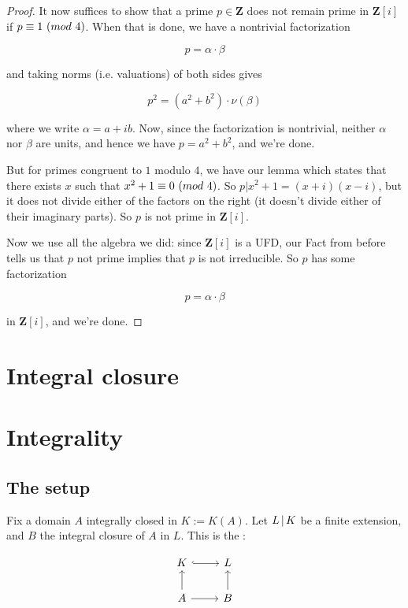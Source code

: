 \begin{proof}
  It now suffices to show that a prime \(p\in{\mathbf Z}\) does not remain prime
  in \({\mathbf Z}[i]\) if \(p\equiv 1\ (\mathnormal{mod}\ 4)\). When that is done, we have a
  nontrivial factorization

  \[ p=\alpha\cdot\beta \]

  and taking norms (i.e. valuations) of both sides gives

  \[ p^2 = (a^2 + b^2) \cdot\nu(\beta) \]

  where we write \(\alpha = a+ib\). Now, since the factorization is nontrivial,
  neither \(\alpha\) nor \(\beta\) are units, and hence we have \( p = a^2 + b^2
  \), and we're done.

  But for primes congruent to \(1\) modulo \(4\), we have our lemma which states
  that there exists \(x\) such that \(x^2+1\equiv 0\ (\mathnormal{mod}\ 4)\). So \(p|x^2+1 =
  (x+i)(x-i)\), but it does not divide either of the factors on the right (it
  doesn't divide either of their imaginary parts). So \(p\) is not prime in
  \({\mathbf Z}[i]\).

  Now we use all the algebra we did: since \({\mathbf Z}[i]\) is a UFD, our Fact
  from before tells us that \(p\) not prime implies that \(p\) is not
  irreducible. So \(p\) has some factorization

  \[p=\alpha\cdot\beta\]

  in \({\mathbf Z}[i]\), and we're done.
\end{proof}

\section{Integral closure}

\section{Integrality}

\subsection{The setup}
Fix a domain $A$ integrally closed in $K := K(A)$. Let $L \mathop{|} K$ be a
finite extension, and $B$ the integral closure of $A$ in $L$. This is the
:

\[
  \begin{tikzcd}
    K \arrow[r, hook] & L \\
    A \arrow[u] \arrow[r] & B \arrow[u]
  \end{tikzcd}
\]

